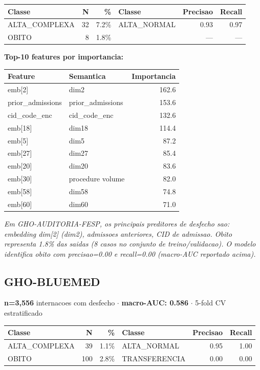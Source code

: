 \documentclass[11pt,a4paper]{article}
\begin{document}
\begin{tabular}{lrr|lrr}
\toprule
Classe & N & \% & Classe & Precisao & Recall \\
\midrule
ALTA\_COMPLEXA & 32 & 7.2\% & ALTA\_NORMAL & 0.93 & 0.97 \\
OBITO & 8 & 1.8\% &  & --- & --- \\
\bottomrule
\end{tabular}

\vspace{4pt}\noindent\textbf{Top-10 features por importancia:}

\begin{tabular}{llr}
\toprule
Feature & Semantica & Importancia \\
\midrule
emb[2] & dim2 & 162.6 \\
prior\_admissions & prior\_admissions & 153.6 \\
cid\_code\_enc & cid\_code\_enc & 132.6 \\
emb[18] & dim18 & 114.4 \\
emb[5] & dim5 & 87.2 \\
emb[27] & dim27 & 85.4 \\
emb[20] & dim20 & 83.6 \\
emb[30] & procedure volume & 82.0 \\
emb[58] & dim58 & 74.8 \\
emb[60] & dim60 & 71.0 \\
\bottomrule
\end{tabular}

\vspace{4pt}\noindent\textit{Em GHO-AUDITORIA-FESP, os principais preditores de desfecho sao: embedding dim[2] (dim2), admissoes anteriores, CID de admissao. Obito representa 1.8\% das saidas (8 casos no conjunto de treino/validacao). O modelo identifica obito com precisao=0.00 e recall=0.00 (macro-AUC reportado acima).}

\subsection{GHO-BLUEMED}
\textbf{n=3,556} internacoes com desfecho $\cdot$ \textbf{macro-AUC: 0.586} $\cdot$ 5-fold CV estratificado

\begin{tabular}{lrr|lrr}
\toprule
Classe & N & \% & Classe & Precisao & Recall \\
\midrule
ALTA\_COMPLEXA & 39 & 1.1\% & ALTA\_NORMAL & 0.95 & 1.00 \\
OBITO & 100 & 2.8\% & TRANSFERENCIA & 0.00 & 0.00 \\
\bottomrule
\end{tabular}
\end{document}
